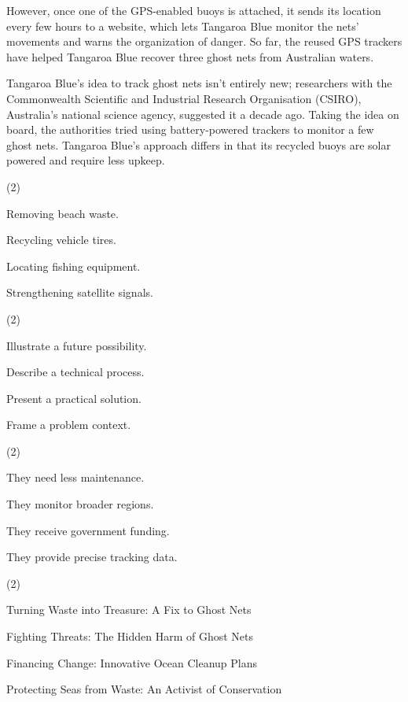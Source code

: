 \documentclass{英语试卷}
\begin{document}
\par However, once one of the GPS-enabled buoys is attached, it sends its location every few hours to a website, which lets Tangaroa Blue monitor the nets' movements and warns the organization of danger. So far, the reused GPS trackers have helped Tangaroa Blue recover three ghost nets from Australian waters.\par
\par Tangaroa Blue's idea to track ghost nets isn't entirely new; researchers with the Commonwealth Scientific and Industrial Research Organisation (CSIRO), Australia's national science agency, suggested it a decade ago. Taking the idea on board, the authorities tried using battery-powered trackers to monitor a few ghost nets. Tangaroa Blue's approach differs in that its recycled buoys are solar powered and require less upkeep.\par
{}
\begin{choices}(2)
  \item Removing beach waste.
  \item Recycling vehicle tires.
  \item Locating fishing equipment.
  \item Strengthening satellite signals.
\end{choices}
\begin{choices}(2)
  \item Illustrate a future possibility.
  \item Describe a technical process.
  \item Present a practical solution.
  \item Frame a problem context.
\end{choices}
\begin{choices}(2)
  \item They need less maintenance.
  \item They monitor broader regions.
  \item They receive government funding.
  \item They provide precise tracking data.
\end{choices}
\begin{choices}(2)
  \item Turning Waste into Treasure: A Fix to Ghost Nets
  \item Fighting Threats: The Hidden Harm of Ghost Nets
  \item Financing Change: Innovative Ocean Cleanup Plans
  \item Protecting Seas from Waste: An Activist of Conservation
\end{choices}
\end{document}
